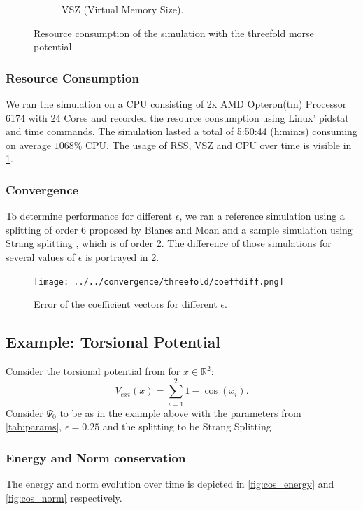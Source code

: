 \documentclass[11pt, a4paper, oneside]{article}
\begin{document}
\begin{figure}[h!]
\begin{subfigure}[b]{0.45 \textwidth}
    \caption{VSZ (Virtual Memory Size).}
  \end{subfigure}
  \caption{Resource consumption of the simulation with the threefold morse potential.}
  \label{fig:threefold_resource}
\end{figure}

\subsubsection{Resource Consumption}
We ran the simulation on a CPU consisting of 2x AMD Opteron(tm) Processor 6174 with 24 Cores and recorded the resource consumption using Linux' pidstat and time commands. The simulation lasted a total of 5:50:44 (h:min:s) consuming on average $1068 \%$ CPU. The usage of RSS, VSZ and CPU over time is visible in \cref{fig:threefold_resource}.


\subsubsection{Convergence} \label{sec:threefold_conv}
To determine performance for different $\epsilon$, we ran a reference simulation using a splitting of order 6 proposed by Blanes and Moan  and a sample simulation using Strang splitting , which is of order 2. The difference of those simulations for several values of $\epsilon$ is portrayed in \cref{fig:convthreefold}.
\begin{figure}[h]
  \centering
  \texttt{[image: ../../convergence/threefold/coeffdiff.png]}
  \caption{Error of the coefficient vectors for different $\epsilon$.}
  \label{fig:convthreefold}
\end{figure}

\subsection{Example: Torsional Potential}
Consider the torsional potential from  for $x \in \mathbb{R}^2$:
\begin{equation*}
  V_{ext}(x) = \sum_{i=1}^2 1 - \cos(x_i).
\end{equation*}
Consider $\Psi_0$ to be as in the example above with the parameters from \cref{tab:params}, $\epsilon = 0.25$ and the splitting to be Strang Splitting .

\subsubsection{Energy and Norm conservation}
The energy and norm evolution over time is depicted in \cref{fig:cos_energy} and \cref{fig:cos_norm} respectively.
\end{document}
